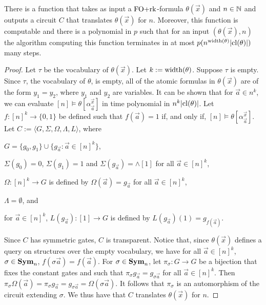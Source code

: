 \documentclass[../paper.tex]{subfiles}
\begin{document}
\begin{lem}
  There is a function that takes as input a $\text{\upshape FO+rk}$-formula $\theta(\vec{x})$
  and $n \in \mathbb{N}$ and outputs a circuit $C$ that translates $\theta(\vec{x})$
  for $n$. Moreover, this function is computable and there is a polynomial in
  $p$ such that for an input $(\theta(\vec{x}), n)$ the algorithm computing this
  function terminates in at most $p(n^{\mathrm{width}(\theta)}\vert \mathrm{cl}(\theta) \vert)$
  many steps.
  \label{lem:translating-FOrk}
\end{lem}
\begin{proof}
  Let $\tau$ be the vocabulary of $\theta(\vec{x})$. Let $k := \mathrm{width}(\theta)$.
  Suppose $\tau$ is empty. Since $\tau$, the vocabulary of $\theta$, is empty,
  all of the atomic formulas in $\theta(\vec{x})$ are of the form $y_1 = y_2$,
  where $y_1$ and $y_2$ are variables. It can be shown that for $\vec{a} \in
  n^k$, we can evaluate $[n] \models \theta[\alpha^{\vec{x}}_{\vec{a}}]$ in time
  polynomial in $n^{k} \vert \mathrm{cl}(\theta) \vert$. Let $f : [n]^k \rightarrow
  \{0,1\}$ be defined such that $f (\vec{a}) = 1$ if, and only if, $[n] \models
  \theta[\alpha^{\vec{x}}_{\vec{a}}]$. Let $C := \langle G, \Sigma, \Omega,
  \Lambda, L \rangle$, where
  \begin{itemizens}
  \item $G = \{g_0, g_1\} \cup \{g_{\vec{a}} : \vec{a} \in [n]^{k}\}$,
  \item $\Sigma (g_0) = 0$, $\Sigma (g_1) = 1$ and $\Sigma (g_{\vec{a}}) =
    \land[1]$ for all $\vec{a} \in [n]^k$,
  \item $\Omega : [n]^k \rightarrow G$ is defined by $\Omega(\vec{a}) =
    g_{\vec{a}}$ for all $\vec{a} \in [n]^k$,
  \item $\Lambda = \emptyset$, and
  \item for $\vec{a} \in [n]^k$, $L(g_{\vec{a}}) : [1] \rightarrow G$ is defined
    by $L(g_{\vec{a}})(1) = g_{f(\vec{a})}$.
  \end{itemizens}
  
  Since $C$ has symmetric gates, $C$ is transparent. Notice that, since
  $\theta(\vec{x})$ defines a query on structures over the empty vocabulary, we
  have for all $\vec{a} \in [n]^k$, $\sigma \in \text{\textbf{Sym}}_n$, $f(\sigma \vec{a}) =
  f(\vec{a})$. For $\sigma \in \text{\textbf{Sym}}_n$, let $\pi_\sigma : G \rightarrow G$ be a
  bijection that fixes the constant gates and such that $\pi_{\sigma}
  g_{\vec{a}} = g_{\sigma \vec{a}}$ for all $\vec{a} \in [n]^k$. Then
  $\pi_\sigma \Omega (\vec{a}) = \pi_\sigma g_{\vec{a}} = g_{\sigma \vec{a}} =
  \Omega (\sigma \vec{a})$. It follows that $\pi_\sigma$ is an automorphism of
  the circuit extending $\sigma$. We thus have that $C$ translates
  $\theta(\vec{x})$ for $n$.


\end{proof}
\end{document}
